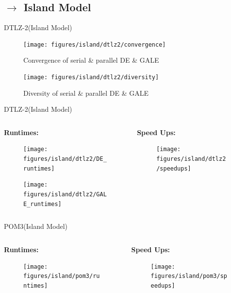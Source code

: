 \documentclass[10pt]{beamer}
\begin{document}
\subsection{$\rightarrow$ Island Model}
\begin{frame}{DTLZ-2(Island Model)}
    \begin{figure}
		\centering
        \texttt{[image: figures/island/dtlz2/convergence]}
        \caption{Convergence of serial \& parallel DE \& GALE}
        \label{fig:DTLZ2_convergence}
	\end{figure}
	\pause
	\begin{figure}
		\centering
        \texttt{[image: figures/island/dtlz2/diversity]}
        \caption{Diversity of serial \& parallel DE \& GALE}
        \label{fig:DTLZ2_diversity}
	\end{figure}
\end{frame}
\begin{frame}{DTLZ-2(Island Model)}
    \begin{columns}[t]
        \begin{column}{0.5\linewidth}
        \textbf{Runtimes:}
        \begin{figure}
            \centering
            \texttt{[image: figures/island/dtlz2/DE\_runtimes]}
            \label{fig:DTLZ2_DE_runtimes}
        \end{figure}
        \begin{figure}
            \centering
            \texttt{[image: figures/island/dtlz2/GALE\_runtimes]}
            \label{fig:DTLZ2_GALE_runtimes}
        \end{figure}
        \end{column}
        \begin{column}{0.5\linewidth}
        \textbf{Speed Ups:}
        \begin{figure}
            \centering
            \texttt{[image: figures/island/dtlz2/speedups]}
            \label{fig:DTLZ2_speedups}
        \end{figure}
        \end{column}
    \end{columns}
\end{frame}
\begin{frame}{POM3(Island Model)}
    \begin{columns}[t]
        \begin{column}{0.5\linewidth}
        \textbf{Runtimes:}
        \begin{figure}
            \centering
            \texttt{[image: figures/island/pom3/runtimes]}
            \label{fig:POM3_runtimes}
        \end{figure}
        \end{column}
        \begin{column}{0.5\linewidth}
        \textbf{Speed Ups:}
        \begin{figure}
            \centering
            \texttt{[image: figures/island/pom3/speedups]}
            \label{fig:POM3_speedups}
        \end{figure}
        \end{column}
    \end{columns}
\end{frame}
\end{document}
